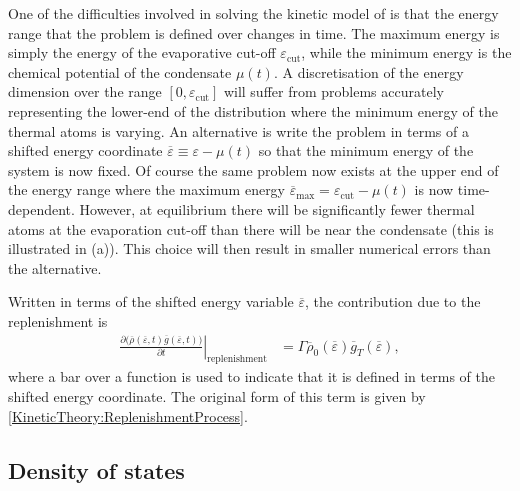 One of the difficulties involved in solving the kinetic model of  is that the energy range that the problem is defined over changes in time.  The maximum energy is simply the energy of the evaporative cut-off $\varepsilon_\text{cut}$, while the minimum energy is the chemical potential of the condensate $\mu(t)$.  A discretisation of the energy dimension over the range $[0, \varepsilon_\text{cut}]$ will suffer from problems accurately representing the lower-end of the distribution where the minimum energy of the thermal atoms is varying.  An alternative is write the problem in terms of a shifted energy coordinate $\overline{\varepsilon} \equiv \varepsilon - \mu(t)$ so that the minimum energy of the system is now fixed.  Of course the same problem now exists at the upper end of the energy range where the maximum energy $\overline{\varepsilon}_\text{max} = \varepsilon_\text{cut} - \mu(t)$ is now time-dependent.  However, at equilibrium there will be significantly fewer thermal atoms at the evaporation cut-off than there will be near the condensate (this is illustrated in (a)).  This choice will then result in smaller numerical errors than the alternative.

Written in terms of the shifted energy variable $\overline{\varepsilon}$, the contribution due to the replenishment is
\begin{align}
    \left. \frac{\partial\big(\overline{\rho}(\overline{\varepsilon}, t) \overline{g}(\overline{\varepsilon}, t)\big)}{\partial t}\right|_\text{replenishment} &= \Gamma \overline{\rho}_0(\overline{\varepsilon}) \overline{g}_T(\overline{\varepsilon}),
    \label{MethodsAppendix:KineticTheory:ReplenishmentProcess}
\end{align}
where a bar over a function is used to indicate that it is defined in terms of the shifted energy coordinate.  The original form of this term is given by \eqref{KineticTheory:ReplenishmentProcess}.

\subsection{Density of states}
\label{MethodsAppendix:QKTDensityOfStates}

